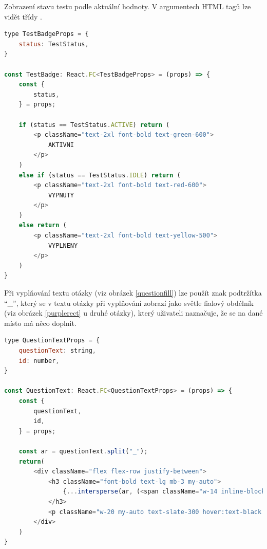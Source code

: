 Zobrazení stavu testu podle aktuální hodnoty. V argumentech  HTML tagů lze vidět třídy .

\begin{lstlisting}[language=JavaScript,caption={Úryvek z \M{/src/pages/admin/tests/index.tsx}; Status testu}]
type TestBadgeProps = {
    status: TestStatus,
}

const TestBadge: React.FC<TestBadgeProps> = (props) => {
    const {
        status,
    } = props;

    if (status == TestStatus.ACTIVE) return (
        <p className="text-2xl font-bold text-green-600">
            AKTIVNI
        </p>
    )
    else if (status == TestStatus.IDLE) return (
        <p className="text-2xl font-bold text-red-600">
            VYPNUTY
        </p>
    )
    else return (
        <p className="text-2xl font-bold text-yellow-500">
            VYPLNENY
        </p>
    )
}
\end{lstlisting}

\newpage
Při vyplňování textu otázky (viz obrázek \ref{questionfill}) lze použít znak podtržítka \enquote{\_}, který se v textu otázky při vyplňování zobrazí jako světle fialový obdélník (viz obrázek \ref{purplerect} u druhé otázky), který uživateli naznačuje, že se na dané místo má něco doplnit. 

\begin{lstlisting}[language=JavaScript,caption={Úryvek z \M{/src/pages/test/index.tsx}; komponent textu otázky, výměna znaku \enquote{\_} za fialový obdélník}]
type QuestionTextProps = {
    questionText: string,
    id: number,
}

const QuestionText: React.FC<QuestionTextProps> = (props) => {
    const {
        questionText,
        id,
    } = props;

    const ar = questionText.split("_");
    return(
        <div className="flex flex-row justify-between"> 
            <h3 className="font-bold text-lg mb-3 my-auto">
                {...intersperse(ar, (<span className="w-14 inline-block rounded-lg bg-purple-100 border-2 border-purple-200 mx-1 text-transparent">___</span>))}
            </h3>
            <p className="w-20 my-auto text-slate-300 hover:text-black hover:font-semibold mx-2">id: {id}</p>
        </div>
    )
}
\end{lstlisting}


